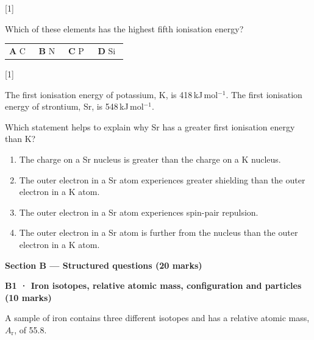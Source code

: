 \documentclass[10pt,a4paper]{article}
\newcommand{\answerlines}[1]{%
  \par\vspace{0.08em}%
  \foreach \n in {1,...,#1}{\noindent\rule{\linewidth}{0.2pt}\\[0.62em]}%
}
\newcommand{\qhead}[2]{%
  \par\vspace{0.28em}%
  \Needspace{4.2em}%
  \noindent{\small\textbf{#1}}\hfill{\small[#2]}\par\vspace{0.08em}%
}
\begin{document}
\qhead{A12.}{1}
{\small Which of these elements has the highest fifth ionisation energy?}
\vspace{0.06em}
{\small
\begin{tabular}{@{}p{0.22\linewidth}p{0.22\linewidth}p{0.22\linewidth}p{0.22\linewidth}@{}}
\textbf{A} C & \textbf{B} N & \textbf{C} P & \textbf{D} Si
\end{tabular}}
\par

\Needspace{14em}
\qhead{A13.}{1}
{\small The first ionisation energy of potassium, K, is 418\,kJ\,mol$^{-1}$. The first ionisation energy of strontium, Sr, is 548\,kJ\,mol$^{-1}$.}

{\small Which statement helps to explain why Sr has a greater first ionisation energy than K?}
\begin{enumerate}[label=\textbf{\Alph*}, leftmargin=1.7em, itemsep=0.08em]
\item The charge on a Sr nucleus is greater than the charge on a K nucleus.
\item The outer electron in a Sr atom experiences greater shielding than the outer electron in a K atom.
\item The outer electron in a Sr atom experiences spin-pair repulsion.
\item The outer electron in a Sr atom is further from the nucleus than the outer electron in a K atom.
\end{enumerate}

\clearpage
\renewcommand{\answerlines}[1]{%
  \par\vspace{0.02em}%
  \foreach \n in {1,...,#1}{\noindent\rule{\linewidth}{0.2pt}\\[0.40em]}%
}
\renewcommand{\qhead}[2]{%
  \par\vspace{0.10em}%
  \Needspace{3.0em}%
  \noindent{\small\textbf{#1}}\hfill{\small[#2]}\par\vspace{0.02em}%
}

{\large\bfseries Section B --- Structured questions (20 marks)}\par\vspace{0.06em}
{\normalsize\bfseries B1 · Iron isotopes, relative atomic mass, configuration and particles (10 marks)}\par

{\small A sample of iron contains three different isotopes and has a relative atomic mass, $A_\mathrm{r}$, of 55.8.}
\end{document}

